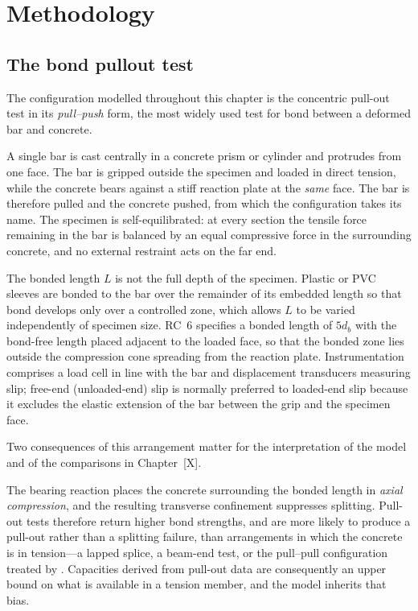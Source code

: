 \chapter{Methodology}
\label{ch:method}

\section{The bond pullout test}
\label{sec:test}

The configuration modelled throughout this chapter is the concentric pull-out
test in its \emph{pull--push} form, the most widely used test for bond between a
deformed bar and concrete.

\noindent A single bar is cast centrally in a concrete prism or cylinder and protrudes from one face. The bar is gripped outside the specimen and loaded in direct
tension, while the concrete bears against a stiff reaction plate at the
\emph{same} face. The bar is therefore pulled and the concrete pushed, from which the configuration takes its name. The specimen is self-equilibrated: at every section the tensile force remaining in the bar is balanced by an equal compressive force in the surrounding concrete, and no external restraint acts on the far end.

The bonded length $L$ is not the full depth of the specimen. Plastic or PVC
sleeves are bonded to the bar over the remainder of its embedded length so
that bond develops only over a controlled zone, which allows $L$ to be varied
independently of specimen size. RC~6 specifies a bonded length of $5d_b$ with
the bond-free length placed adjacent to the loaded face, so that the bonded
zone lies outside the compression cone spreading from the reaction plate.
Instrumentation comprises a load cell in line with the bar and displacement
transducers measuring slip; free-end (unloaded-end) slip is normally preferred
to loaded-end slip because it excludes the elastic extension of the bar
between the grip and the specimen face.

Two consequences of this arrangement matter for the interpretation of the
model and of the comparisons in Chapter~[X].

The bearing reaction places the concrete surrounding the bonded length in
\emph{axial compression}, and the resulting transverse confinement suppresses
splitting. Pull-out tests therefore return higher bond strengths, and are more
likely to produce a pull-out rather than a splitting failure, than
arrangements in which the concrete is in tension---a lapped splice, a beam-end
test, or the pull--pull configuration treated by
\textcite{alaviAnalyticalProcedureFailure2025}. Capacities derived from
pull-out data are consequently an upper bound on what is available in a
tension member, and the model inherits that bias.

